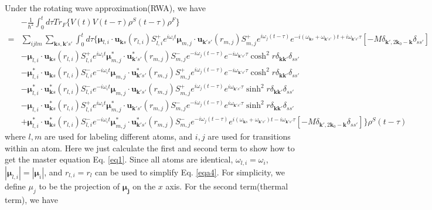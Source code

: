 \documentclass[aps,showpacs,twocolumn,twoside,groupedaddress]{revtex4}
\let\vec\bm
\begin{document}
\begin{widetext}
Under the rotating wave approximation(RWA), we have
\begin{equation}
\label{eqa4}\tag{A5}
\begin{split}
&-\frac{1}{\hbar^{2}}\int_{0}^{t}d\tau Tr_{F}\{V(t)V(t-\tau)\rho^{S}(t-\tau)\rho^{F}\}\\
=&\sum_{ijlm}\underset{\vec{k}s,\vec{k'}s'}{\sum}\int_{0}^{t}d\tau\{\vec{\mu}{}_{l,i}\cdot\vec{u}_{\vec{k}s}(r_{l,i})S_{l,i}^{+}e^{i\omega_{i}t}\vec{\mu}_{m,j}\cdot\vec{u}_{\vec{k}'s'}(r_{m,j})S_{m,j}^{+}e^{i\omega_{j}(t-\tau)}e^{-i(\omega_{\vec{k}s}+\omega_{\vec{k}'s'})t+i\omega_{\vec{k}'s'}\tau}[-M\delta_{\vec{k}',2\vec{k}_{0}-\vec{k}}\delta_{ss'}]\\
&-\vec{\mu}_{l,i}\cdot\vec{u}_{\vec{k}s}(r_{l,i})S_{l,i}^{+}e^{i\omega_{i}t}\vec{\mu}_{m,j}^{*}\cdot\vec{u}_{\vec{k}'s'}^{*}(r_{m,j})S_{m,j}^{-}e^{-i\omega_{j}(t-\tau)}e^{-i\omega_{\vec{k}'s'}\tau}\cosh^{2}r\delta_{\vec{k}\vec{k}'}\delta_{ss'}\\
&-\vec{\mu}_{l,i}^{*}\cdot\vec{u}_{\vec{k}s}(r_{l,i})S_{l,i}^{-}e^{-i\omega_{i}t}\vec{\mu}_{m,j}\cdot\vec{u}_{\vec{k}'s'}^{*}(r_{m,j})S_{m,j}^{+}e^{i\omega_{j}(t-\tau)}e^{-i\omega_{\vec{k}'s'}\tau}\cosh^{2}r\delta_{\vec{k}\vec{k}'}\delta_{ss'}\\
&-\vec{\mu}_{l,i}^{*}\cdot\vec{u}_{\vec{k}s}^{*}(r_{l,i})S_{l,i}^{-}e^{-i\omega_{i}t}\vec{\mu}_{m,j}\cdot\vec{u}_{\vec{k}'s'}(r_{m,j})S_{m,j}^{+}e^{i\omega_{j}(t-\tau)}e^{i\omega_{\vec{k}'s'}\tau}\sinh^{2}r\delta_{\vec{k}\vec{k}'}\delta_{ss'}\\
&-\vec{\mu}_{l,i}\cdot\vec{u}_{\vec{k}s}^{*}(r_{l,i})S_{l,i}^{+}e^{i\omega_{i}t}\vec{\mu}_{m,j}^{*}\cdot\vec{u}_{\vec{k}'s'}(r_{m,j})S_{m,j}^{-}e^{-i\omega_{j}(t-\tau)}e^{i\omega_{\vec{k}'s'}\tau}\sinh^{2}r\delta_{\vec{k}\vec{k}'}\delta_{ss'}\\
&+\vec{\mu}_{l,i}^{*}\cdot\vec{u}_{\vec{k}s}^{*}(r_{l,i})S_{l,i}^{-}e^{-i\omega_{i}t}\vec{\mu}_{m,j}^{*}\cdot\vec{u}_{\vec{k}'s'}^{*}(r_{m,j})S_{m,j}^{-}e^{-i\omega_{j}(t-\tau)}e^{i(\omega_{\vec{k}s}+\omega_{\vec{k}'s'})t-i\omega_{\vec{k}'s'}\tau}[-M\delta_{\vec{k}',2\vec{k}_{0}-\vec{k}}\delta_{ss'}]\}\rho^{S}(t-\tau)
\end{split}
\end{equation}
where $l,m$ are used for labeling different atoms, and $i,j$ are used for transitions within an atom. Here we just calculate the first and second term to show how to get the master equation Eq. \eqref{eq1}. Since all atoms are identical, $\omega_{l,i}=\omega_{i}$, $|\vec\mu_{l,i}|=|\vec\mu_i|$, and $r_{l,i}=r_{l}$ can be used to simplify Eq.  \eqref{eqa4}. For simplicity, we define $\mu_j$ to be the projection of $\vec{\mu_j}$ on the $x$ axis. For the second term(thermal term), we have

\end{widetext}
\end{document}
